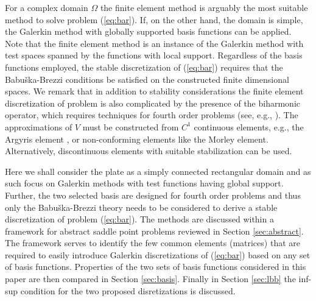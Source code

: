 \documentclass{marine_2015}
\begin{document}
For a complex domain $\Omega$ the finite element method is arguably the most 
suitable method to solve problem (\ref{eq:bar}). If, on the other hand, the
domain is simple, the Galerkin method with globally supported basis functions
can be applied. Note that the finite element method is an instance of the Galerkin 
method with test spaces spanned by the functions with local support. Regardless
of the basis functions employed, the stable discretization of (\ref{eq:bar})
requires that the Babu\v{s}ka-Brezzi conditions be satisfied on the constructed
finite dimensional spaces. We remark that in addition to stability
considerations the finite element discretization of problem is also complicated
by the presence of the biharmonic operator, which requires techniques for fourth order 
problems (see, e.g., \cite{brenner}). The approximations of $V$ must be constructed 
from $C^1$ continuous elements, e.g., the Argyris element \cite{argyris}, or non-conforming 
elements like the Morley element\cite{morley}. Alternatively, discontinuous elements with 
suitable stabilization \cite{brenner_ip} can be used. 

Here we shall consider the plate as a simply connected rectangular domain and as
such focus on Galerkin methods with test functions having global support.
Further, the two selected basis are designed for fourth order problems and thus 
only the Babu\v{s}ka-Brezzi theory needs to be considered to derive a stable
discretization of problem (\ref{eq:bar}). The methods are discussed within a
framework for abstract saddle point problems reviewed in Section
\ref{sec:abstract}. The framework serves to identify the few common
elements (matrices) that are required to easily introduce Galerkin discretizations of
(\ref{eq:bar}) based on any set of basis functions. Properties of the two sets of
basis functions considered in this paper are then compared in Section \ref{sec:basis}.
Finally in Section \ref{sec:lbb} the inf-sup condition for the two proposed
disretizations is discussed.
\end{document}
